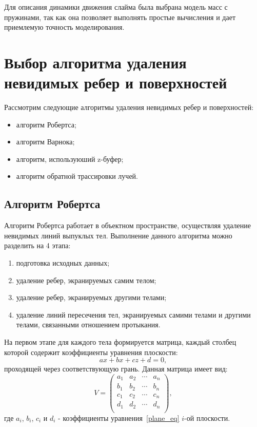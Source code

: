 Для описания динамики движения слайма была выбрана модель масс с
пружинами, так как она позволяет выполнять простые вычисления и дает
приемлемую точность моделирования.

\section{Выбор алгоритма удаления невидимых ребер и поверхностей}

Рассмотрим следующие алгоритмы удаления невидимых ребер и поверхностей:

\begin{itemize}
	\item алгоритм Робертса;
	\item алгоритм Варнока;
	\item алгоритм, используюший z-буфер;
	\item алгоритм обратной трассировки лучей.
\end{itemize}

\subsection{Алгоритм Робертса}

Алгоритм Робертса работает в объектном пространстве, осуществляя
удаление невидимых линий выпуклых тел. Выполнение данного алгоритма можно
разделить на 4 этапа:

\begin{enumerate}
	\item подготовка исходных данных;
	\item удаление ребер, экранируемых самим телом;
	\item удаление ребер, экранируемых другими телами;
	\item удаление линий пересечения тел, экранируемых самими телами и другими телами, связанными отношением протыкания.
\end{enumerate}

На первом этапе для каждого тела формируется матрица, каждый столбец
которой содержит коэффициенты уравнения плоскости:
\begin{equation}\label{plane_eq}
	ax + bx + cz + d = 0,
\end{equation}
проходящей через соответствующую грань. Данная матрица имеет вид:
$$
V =
\begin{pmatrix}
	a_1 & a_2 & \cdots & a_n \\
	b_1 & b_2 & \cdots & b_n \\
	c_1 & c_2 & \cdots & c_n \\
	d_1 & d_2 & \cdots & d_n \\
\end{pmatrix},
$$
где $a_i$, $b_i$, $c_i$ и $d_i$ - коэффициенты уравнения~\eqref{plane_eq} $i$-ой плоскости.

